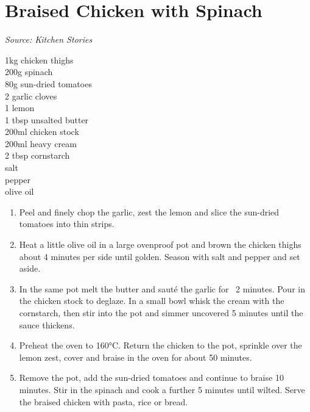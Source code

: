 \documentclass{report}
\begin{document}
\section{Braised Chicken with Spinach}
\textit{Source: Kitchen Stories}\\
\begin{minipage}[t]{0.21\textwidth} \vspace{0pt} 
1kg chicken thighs\\
200g spinach\\
80g sun-dried tomatoes\\
2 garlic cloves\\
1 lemon\\
1 tbsp unsalted butter\\
200ml chicken stock\\
200ml heavy cream\\
2 tbsp cornstarch\\
salt\\
pepper\\
olive oil
\end{minipage}
\hfill
\begin{minipage}[t]{0.78\textwidth} \vspace{0pt}
	\begin{enumerate}
		\item Peel and finely chop the garlic, zest the lemon and slice the sun-dried tomatoes into thin strips.
		\item Heat a little olive oil in a large ovenproof pot and brown the chicken thighs about 4 minutes per side until golden. Season with salt and pepper and set aside.
		\item In the same pot melt the butter and sauté the garlic for ~2 minutes. Pour in the chicken stock to deglaze. In a small bowl whisk the cream with the cornstarch, then stir into the pot and simmer uncovered 5 minutes until the sauce thickens.
		\item Preheat the oven to 160°C. Return the chicken to the pot, sprinkle over the lemon zest, cover and braise in the oven for about 50 minutes.
		\item Remove the pot, add the sun-dried tomatoes and continue to braise 10 minutes. Stir in the spinach and cook a further 5 minutes until wilted. Serve the braised chicken with pasta, rice or bread.
	\end{enumerate}	
\end{minipage}
\end{document}
